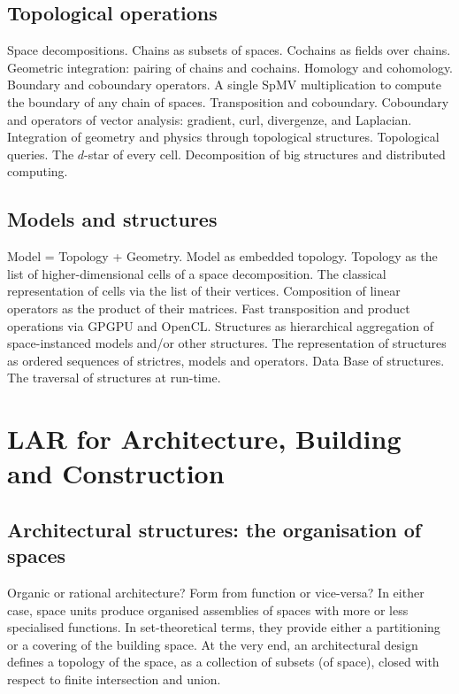 \documentclass[11pt,oneside]{article}    %
\begin{document}
\subsection{Topological operations}
Space decompositions. Chains as subsets of spaces. Cochains as fields over chains. Geometric integration: pairing of chains and cochains. Homology and cohomology. Boundary and coboundary operators. A single SpMV multiplication to compute the boundary of any chain of spaces.
Transposition and coboundary. Coboundary and operators of vector analysis: gradient, curl, divergenze, and Laplacian. Integration of geometry and physics through topological structures. Topological queries. The $d$-star of every cell. Decomposition of big structures and distributed computing.

\subsection{Models and structures}
Model = Topology + Geometry. Model as embedded topology. Topology as the list of higher-dimensional cells of a space decomposition. The classical representation of cells via the list of their vertices. Composition of linear operators as the product of their matrices.
Fast transposition and product operations via GPGPU and OpenCL. Structures as hierarchical aggregation of space-instanced models and/or other structures. The representation of structures as ordered sequences of strictres, models and operators. Data Base of structures. The traversal of structures at run-time.

\section{LAR for Architecture, Building and Construction}\label{sec:abc}
\subsection{Architectural structures: the organisation of spaces}
Organic or rational architecture? Form from function or vice-versa? In either case, space units produce organised assemblies of spaces with more or less specialised functions. In set-theoretical terms, they provide either a partitioning or a covering of the building space. At the very end, an architectural design defines a topology of the space, as a collection of subsets (of space), closed with respect to finite intersection and union. 
\end{document}
